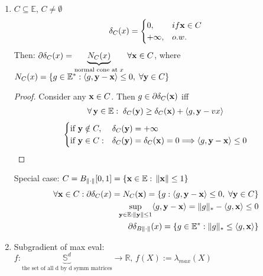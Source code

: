 \documentclass[11pt]{article}
\begin{document}
\begin{example}
\begin{enumerate}
        \item  $C \subseteq  \mathbb{E},\, C \neq \emptyset$
        \begin{equation}
            \delta_{C}(x) = 
            \begin{cases} 
            0, & if {\mathbf{x}} \in C  \\ 
            +\infty, & o.w.   
            \end{cases}
        \end{equation}
        Then: $\partial \delta_{C}(x) = \underbrace{N_{C}(x)}_{\text{normal cone at } x} \; \forall \vx \in C$,
        where $N_{C}(x) = \{ g \in \mathbb{E}^{*}: \langle g,{\mathbf{y}} - {\mathbf{x}} \rangle \le 0,\; \forall {\mathbf{y}} \in C \}$
        \begin{proof}
            Consider any ${\mathbf{x}} \in C$. Then $g \in \partial \delta_{C}({\mathbf{x}})$ iff 
            \begin{align*}
                \forall \, {\mathbf{y}} \in \mathbb{E}: \; \delta_{C}({\mathbf{y}}) \ge \delta_{C}({\mathbf{x}}) + \langle g,{\mathbf{y}} - vx \rangle
            \end{align*}
            \begin{equation}
                \begin{cases} 
                \text{if }{\mathbf{y}} \notin C, & \delta_{C}({\mathbf{y}}) = +\infty \\ 
                \text{if }{\mathbf{y}} \in C: &   \delta_{C}({\mathbf{y}}) = \delta_{C}({\mathbf{x}}) = 0 
                \Longrightarrow \langle g,{\mathbf{y}}-{\mathbf{x}} \rangle \le 0
                \end{cases}
            \end{equation}
        \end{proof}
        Special case: $C = B_{\| \cdot  \| }[0,1] = \{ {\mathbf{x}} \in \mathbb{E}: \, \| {\mathbf{x}} \|\le 1  \}$
            \begin{align*}
                \forall  {\mathbf{x}} \in C: \partial \delta_{C}(x) = N_{C}({\mathbf{x}}) = \{ 
                    g: \langle g,{\mathbf{y}}-{\mathbf{x}} \rangle \le 0, \; \forall {\mathbf{y}} \in C
                 \}\\
                 \sup_{{\mathbf{y}} \in \mathbb{E}: \| {\mathbf{y}} \|\le 1 }\langle g, {\mathbf{y}} - {\mathbf{x}} \rangle 
                 = \| g \|_{*} - \langle g,{\mathbf{x}} \rangle \le 0\\
                 \partial \delta_{B\| \cdot  \| }(x) = \{ g \in \mathbb{E}^{*}: 
                 \| g \|_{*} \le \langle g,{\mathbf{x}} \rangle \}
            \end{align*}

        \item Subgradient of max eval: $f: \underbrace{\mathbb{S}^{d}}_{\text{the set of all d by d symm matrices}} 
        \to \mathbb{R},\, f(X) := \lambda_{max}(X)$


\end{enumerate}
\end{example}
\end{document}
